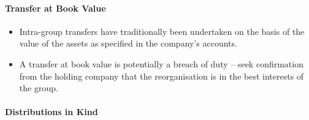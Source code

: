 \documentclass[
]{article}
\providecommand{\tightlist}{%
  \setlength{\itemsep}{0pt}\setlength{\parskip}{0pt}}
\begin{document}
\hypertarget{transfer-at-book-value}{%
\paragraph{Transfer at Book Value}\label{transfer-at-book-value}}

\begin{itemize}
\tightlist
\item
  Intra-group transfers have traditionally been undertaken on the basis
  of the value of the assets as specified in the company's accounts.
\item
  A transfer at book value is potentially a breach of duty -- seek
  confirmation from the holding company that the reorganisation is in
  the best interests of the group.
\end{itemize}

\hypertarget{distributions-in-kind}{%
\paragraph{Distributions in Kind}\label{distributions-in-kind}}
\end{document}
